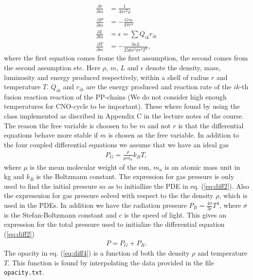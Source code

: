 \documentclass{emulateapj}
\begin{document}
	\begin{align}
		\frac{\partial r}{\partial m} & = \frac{1}{4 \pi r^2 \rho}
		\label{eq:diff1}\\
		\frac{\partial P }{\partial m} & = -\frac{Gm}{4\pi r^4}
		\label{eq:diff2}\\
		\frac{\partial L }{\partial m} & = \epsilon = \sum{ Q_{ik}r_{ik}}
		\label{eq:diff3}\\
		\frac{\partial T}{\partial m} & = -\frac{3\kappa L}{256 \pi^2\sigma r^4T^3},
		\label{eq:diff4}
	\end{align}
	where the first equation comes frome the first assumption, the second comes from the second assumption etc. Here $\rho$, $m$, $L$ and $\epsilon$ denote the density, mass, luminosity and energy produced respectively, within a shell of radius $r$ and temperature $T$. $Q_{ik}$ and $r_{ik}$ are the energy produced and reaction rate of the $ik$-th fusion reaction reaction of the PP-chains (We do not consider high enough temperatures for CNO-cycle to be important). These where found by using the  class implemented as discribed in Appendix C in the lecture notes of the course. The reason the free variable is choosen to be $m$ and not $r$ is that the differential equations behave more stable if $m$ is chosen as the free variable. In addition to the four coupled differential equations we assume that we have an ideal gas
	\begin{align}
		P_G = \frac{\rho}{\mu m_u} k_B T,	
	\end{align}
	where $\mu$ is the mean molecular weight of the sun, $m_u$ is an atomic mass unit in kg and $k_B$ is the Boltzmann constant. The expression for gas pressure is only used to find the initial pressure so as to initiallize the PDE in eq. (\ref{eq:diff2}). Also the expressuion for gas pressure solved with respect to the the density $\rho$, which is used in the PDEs. In addition we have the radiation pressure $P_R = \frac{4\sigma}{3c}T^4$, where $\sigma$ is the Stefan-Boltzmann constant and $c$ is the speed of light. This gives an expression for the total pressure used to initialize the differential equation (\ref{eq:diff2}) 
	\begin{align}
		P = P_G + P_R.
		\label{eq:pressure}
	\end{align}
	The opacity in eq. (\ref{eq:diff4}) is a function of both the density $\rho$ and temperature $T$. This function is found by interpolating the data provided in the file \texttt{opacity.txt}. 
		
\end{document}
